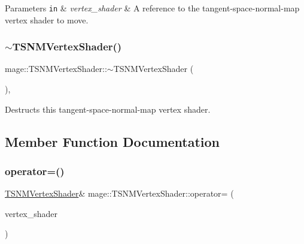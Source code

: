 \begin{DoxyParams}[1]{Parameters}
\mbox{\tt in}  & {\em vertex\+\_\+shader} & A reference to the tangent-\/space-\/normal-\/map vertex shader to move. \\
\hline
\end{DoxyParams}
\hypertarget{classmage_1_1_t_s_n_m_vertex_shader_ac753a201fc0c12978811cca636da107e}{}\label{classmage_1_1_t_s_n_m_vertex_shader_ac753a201fc0c12978811cca636da107e} 
\subsubsection{\texorpdfstring{$\sim$\+T\+S\+N\+M\+Vertex\+Shader()}{~TSNMVertexShader()}}
{\footnotesize\ttfamily mage\+::\+T\+S\+N\+M\+Vertex\+Shader\+::$\sim$\+T\+S\+N\+M\+Vertex\+Shader (\begin{DoxyParamCaption}{ }\end{DoxyParamCaption})\hspace{0.3cm}{\ttfamily [virtual]}, {\ttfamily [default]}}

Destructs this tangent-\/space-\/normal-\/map vertex shader. 

\subsection{Member Function Documentation}
\hypertarget{classmage_1_1_t_s_n_m_vertex_shader_ad3d444a889fcb9a736d0c0d2fba4ea88}{}\label{classmage_1_1_t_s_n_m_vertex_shader_ad3d444a889fcb9a736d0c0d2fba4ea88} 
\subsubsection{\texorpdfstring{operator=()}{operator=()}\hspace{0.1cm}{\footnotesize\ttfamily [1/2]}}
{\footnotesize\ttfamily \hyperlink{classmage_1_1_t_s_n_m_vertex_shader}{T\+S\+N\+M\+Vertex\+Shader}\& mage\+::\+T\+S\+N\+M\+Vertex\+Shader\+::operator= (\begin{DoxyParamCaption}\item[{const \hyperlink{classmage_1_1_t_s_n_m_vertex_shader}{T\+S\+N\+M\+Vertex\+Shader} \&}]{vertex\+\_\+shader }\end{DoxyParamCaption})\hspace{0.3cm}{\ttfamily [delete]}}

